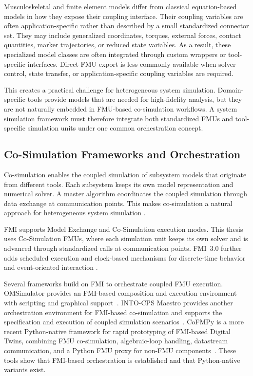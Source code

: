 Musculoskeletal and finite element models differ from classical equation-based models in how they expose their coupling interface.
Their coupling variables are often application-specific rather than described by a small standardized connector set.
They may include generalized coordinates, torques, external forces, contact quantities, marker trajectories, or reduced state variables.
As a result, these specialized model classes are often integrated through custom wrappers or tool-specific interfaces.
Direct \ac{FMU} export is less commonly available when solver control, state transfer, or application-specific coupling variables are required.

This creates a practical challenge for heterogeneous system simulation.
Domain-specific tools provide models that are needed for high-fidelity analysis, but they are not naturally embedded in \ac{FMU}-based co-simulation workflows.
A system simulation framework must therefore integrate both standardized \acp{FMU} and tool-specific simulation units under one common orchestration concept.

\subsection{Co-Simulation Frameworks and Orchestration}

Co-simulation enables the coupled simulation of subsystem models that originate from different tools.
Each subsystem keeps its own model representation and numerical solver.
A master algorithm coordinates the coupled simulation through data exchange at communication points.
This makes co-simulation a natural approach for heterogeneous system simulation \cite{gomes_co-simulation_2019}.

\ac{FMI} supports Model Exchange and Co-Simulation execution modes.
This thesis uses Co-Simulation \acp{FMU}, where each simulation unit keeps its own solver and is advanced through standardized calls at communication points.
\ac{FMI}~3.0 further adds scheduled execution and clock-based mechanisms for discrete-time behavior and event-oriented interaction \cite{modelica_association_project_fmi_functional_2024}.

Several frameworks build on \ac{FMI} to orchestrate coupled \ac{FMU} execution.
OMSimulator provides an \ac{FMI}-based composition and execution environment with scripting and graphical support~\cite{ochel_omsimulator_2019}.
INTO-CPS Maestro provides another orchestration environment for \ac{FMI}-based co-simulation and supports the specification and execution of coupled simulation scenarios~\cite{thule_maestro_2019}.
CoFMPy is a more recent Python-native framework for rapid prototyping of FMI-based Digital Twins, combining FMU co-simulation, algebraic-loop handling, datastream communication, and a Python FMU proxy for non-FMU components~\cite{friedrich_cofmpy_2025}.
These tools show that \ac{FMI}-based orchestration is established and that Python-native variants exist.

